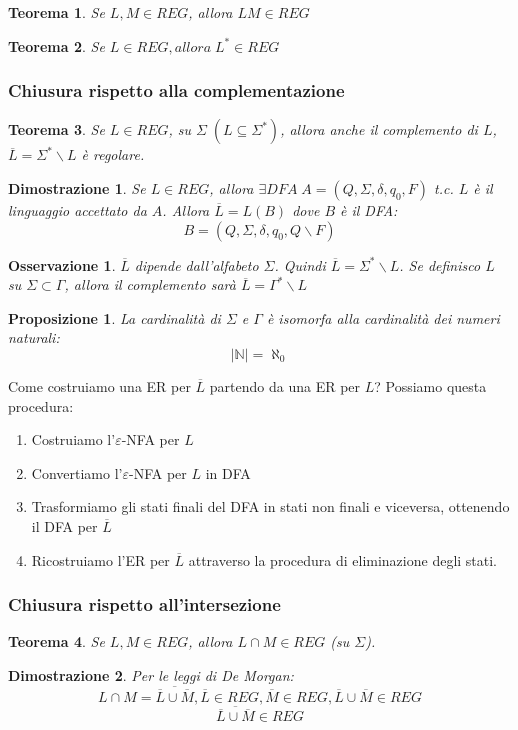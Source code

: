 \documentclass[12pt]{article}
\newtheorem{Teorema}{Teorema}[subsection]
\newtheorem{Proposizione}{Proposizione}[subsection]
\newtheorem{Dimostrazione}{Dimostrazione}[subsection]
\newtheorem{Osservazione}{Osservazione}[subsection]
\begin{document}
\begin{Teorema}
    Se $L, M \in REG$, allora $LM \in REG$
\end{Teorema}
\begin{Teorema}
    Se $L \in REG, allora \; L^* \in REG$
\end{Teorema}
\subsubsection{Chiusura rispetto alla complementazione}
\begin{Teorema}
    Se $L \in REG$, su $\Sigma \; (L \subseteq \Sigma^*)$, allora anche il complemento di $L$, $\overline{L} = \Sigma^* \backslash L$ è regolare.
\end{Teorema}
\begin{Dimostrazione}
    Se $L\in REG$, allora $\exists DFA \; A = (Q, \Sigma, \delta, q_0, F)$ t.c. $L$ è il linguaggio accettato da $A$. Allora $\overline{L} = L(B)$ dove $B$ è il DFA:
    $$B = (Q, \Sigma, \delta, q_0, Q \backslash F)$$
\end{Dimostrazione}
\begin{Osservazione}
    $\overline{L}$ dipende dall'alfabeto $\Sigma$. Quindi $\overline{L} = \Sigma^* \backslash L$. Se definisco $L$ su $\Sigma \subset \Gamma$, allora il complemento sarà $\overline{L} = \Gamma^* \backslash L$
\end{Osservazione}
\begin{Proposizione}
    La cardinalità di $\Sigma$ e $\Gamma$ è isomorfa alla cardinalità dei numeri naturali:
    $$|\mathbb{N}| = \aleph_0$$
\end{Proposizione}
Come costruiamo una ER per $\overline{L}$ partendo da una ER per $L$? Possiamo questa procedura:
\begin{enumerate}
    \item Costruiamo l'$\varepsilon$-NFA per $L$
    \item Convertiamo l'$\varepsilon$-NFA per $L$ in DFA
    \item Trasformiamo gli stati finali del DFA in stati non finali e viceversa, ottenendo il DFA per $\overline{L}$
    \item Ricostruiamo l'ER per $\overline{L}$ attraverso la procedura di eliminazione degli stati.
\end{enumerate}
\subsubsection{Chiusura rispetto all'intersezione}
\begin{Teorema}
    Se $L, M \in REG$, allora $L \cap M \in REG$ (su $\Sigma$).
\end{Teorema}
\begin{Dimostrazione}
    Per le leggi di De Morgan:
    $$L \cap M = \overline{\overline{L} \cup \overline{M}}, \overline{L}\in REG, \overline{M}\in REG, \overline{L} \cup \overline{M}\in REG$$
    $$\overline{\overline{L} \cup \overline{M}} \in REG$$
\end{Dimostrazione}
\end{document}
